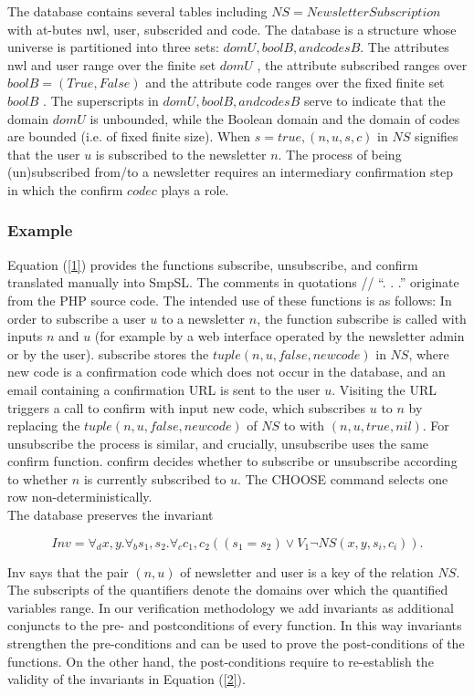 \documentclass[12pt]{acmart}
\begin{document}
The database contains several tables including $NS = NewsletterSubscription$ with at-butes nwl, user, subscrided and code. The database is a structure whose universe is partitioned into three sets: $domU, boolB, and codesB$. The attributes nwl and user range over the finite set $domU$  , the attribute subscribed ranges over $boolB =  (True, False)$ and the attribute code ranges over the fixed finite set $boolB$ . The superscripts in $domU, boolB, and codesB$ serve to indicate that the domain $domU$ is unbounded, while the Boolean domain and the domain of codes are bounded (i.e. of fixed finite size). When $s=true, (n,u,s,c )$ in $NS$ signifies that the user $u$ is subscribed to the newsletter $n$. The process of being (un)subscribed from/to a newsletter requires an intermediary confirmation step in which the confirm $code c$ plays a role. 

\subsubsection{Example}

Equation (\ref{1}) provides the functions subscribe, unsubscribe, and confirm translated manually into SmpSL. The comments in quotations // “. . .” originate from the PHP source code. The intended use of these functions is as follows: In order to subscribe a user $u$ to a newsletter $n$, the function subscribe is called with inputs $n$ and $u$ (for example by a web interface operated by the newsletter admin or by the user). subscribe stores the $tuple(n,u,false,new code)$ in $NS$, where new code is a confirmation code which does not occur in the database, and an email containing a confirmation URL is sent to the user $u$. Visiting the URL triggers a call to confirm with input new code, which subscribes $u$ to $n$ by replacing the $tuple(n,u,false,new code)$ of $NS$ to with $(n,u,true,nil)$. For unsubscribe the process is similar, and crucially, unsubscribe uses the same confirm function. confirm decides whether to subscribe or unsubscribe according to whether $n$ is currently subscribed to $u$. The CHOOSE command selects one row non-deterministically.\\
The database preserves the invariant

\begin{equation}
    Inv = \forall_d x,y.\forall_b s_1,s_2.\forall_c c_1,c_2 ((s_1=s_2 )\vee V_1 \neg NS(x,y,s_i,c_i )).
    \label{1}
\end{equation}

 Inv says that the pair $(n, u)$ of newsletter and user is a key of the relation $NS$. The subscripts of the quantifiers denote the domains over which the quantified variables range. In our verification methodology we add invariants as additional conjuncts to the pre- and postconditions of every function. In this way invariants strengthen the pre-conditions and can be used to prove the post-conditions of the functions. On the other hand, the post-conditions require to re-establish the validity of the invariants in Equation (\ref{2}).
\end{document}
